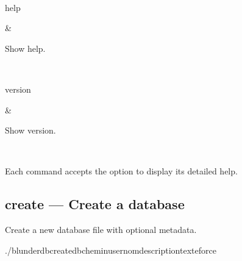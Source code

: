 \documentclass[letterpaper,10pt,english]{sphinxmanual}
\begin{document}
\begin{savenotes}
\begin{tabular}[t]{}
\begin{varwidth}[t]{}
\end{varwidth}%
\\
\sphinxhline\begin{varwidth}[t]{}
\sphinxAtStartPar
help
\sphinxbeforeendvarwidth
\end{varwidth}%
&\begin{varwidth}[t]{}
\sphinxAtStartPar
Show help.
\sphinxbeforeendvarwidth
\end{varwidth}%
\\
\sphinxhline\begin{varwidth}[t]{}
\sphinxAtStartPar
version
\sphinxbeforeendvarwidth
\end{varwidth}%
&\begin{varwidth}[t]{}
\sphinxAtStartPar
Show version.
\sphinxbeforeendvarwidth
\end{varwidth}%
\\
\sphinxbottomrule
\end{tabular}
\sphinxtableafterendhook\par
\sphinxattableend\end{savenotes}

\sphinxAtStartPar
Each command accepts the  option to display its detailed help.


\subsection{create — Create a database}
\label{\detokenize{cli:create-creer-une-base-de-donnees}}
\sphinxAtStartPar
Create a new database file with optional metadata.

\begin{sphinxVerbatim}[commandchars=\\\{\}]
./blunderdbcreate\PYGZhy{}\PYGZhy{}db\PYGZlt{}chemin\PYGZgt{}\PYG{o}{[}\PYGZhy{}\PYGZhy{}user\PYGZlt{}nom\PYGZgt{}\PYG{o}{]}\PYG{o}{[}\PYGZhy{}\PYGZhy{}description\PYGZlt{}texte\PYGZgt{}\PYG{o}{]}\PYG{o}{[}\PYGZhy{}\PYGZhy{}force\PYG{o}{]}
\end{sphinxVerbatim}
\end{document}
